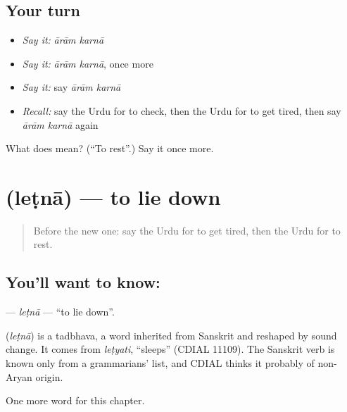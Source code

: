 \subsection*{Your turn}
\begin{itemize}
\raggedright
  \item \emph{Say it:} \emph{ārām karnā}
  \item \emph{Say it:} \emph{ārām karnā}, once more
  \item \emph{Say it:} say \emph{ārām karnā}
  \item \emph{Recall:} say the Urdu for to check, then the Urdu for to get tired, then say \emph{ārām karnā} again
\end{itemize}

\begin{tcolorbox}[breakable,colback=teal!4,colframe=teal!35!black,title={Before you move on}]
What does   mean? (\textquotedblleft{}To rest\textquotedblright{}.) Say it once more.
\end{tcolorbox}
\section[\texorpdfstring{\ur{لیٹنا} (leṭnā)}{لیٹنا (leṭnā)}]{ (leṭnā) — to lie down}

\label{lesson:UR-C182-letna}



\begin{quote}
Before the new one: say the Urdu for to get tired, then the Urdu for to rest.
\end{quote}

\subsection*{You'll want to know: }
\textbf{} — \emph{leṭnā} — \textquotedblleft{}to lie down\textquotedblright{}.

\begin{cousinweb}
\textbf{} (\emph{leṭnā}) is a tadbhava, a word inherited from Sanskrit and reshaped by sound change. It comes from \emph{leṭyati}, \textquotedblleft{}sleeps\textquotedblright{} (CDIAL 11109). The Sanskrit verb is known only from a grammarians' list, and CDIAL thinks it probably of non-Aryan origin.
\end{cousinweb}

\begin{grammarlens}[title={What you've built}]
One more word for this chapter.
\end{grammarlens}

